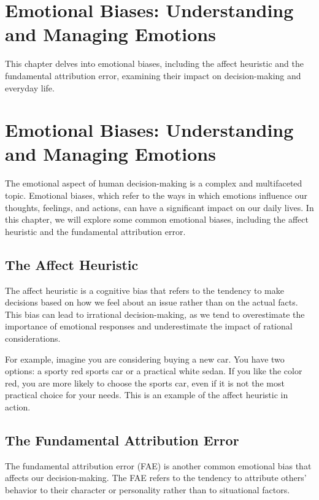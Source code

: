 \documentclass{report}%
\begin{document}
{{{\chapter{Emotional Biases: Understanding and Managing Emotions}%
This chapter delves into emotional biases, including the affect heuristic and the fundamental attribution error, examining their impact on decision-making and everyday life.

%
\chapter{Emotional Biases: Understanding and Managing Emotions}

The emotional aspect of human decision-making is a complex and multifaceted topic. Emotional biases, which refer to the ways in which emotions influence our thoughts, feelings, and actions, can have a significant impact on our daily lives. In this chapter, we will explore some common emotional biases, including the affect heuristic and the fundamental attribution error.

\section{The Affect Heuristic}

The affect heuristic is a cognitive bias that refers to the tendency to make decisions based on how we feel about an issue rather than on the actual facts. This bias can lead to irrational decision-making, as we tend to overestimate the importance of emotional responses and underestimate the impact of rational considerations.

For example, imagine you are considering buying a new car. You have two options: a sporty red sports car or a practical white sedan. If you like the color red, you are more likely to choose the sports car, even if it is not the most practical choice for your needs. This is an example of the affect heuristic in action.

\section{The Fundamental Attribution Error}

The fundamental attribution error (FAE) is another common emotional bias that affects our decision-making. The FAE refers to the tendency to attribute others' behavior to their character or personality rather than to situational factors.

}}}
\end{document}
